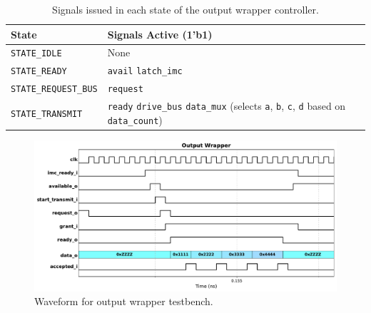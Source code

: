 \documentclass[../main.tex]{subfiles}
\begin{document}
\begin{table}[h]
    \centering
    \renewcommand{\arraystretch}{1.5}
    \setlength{\tabcolsep}{6pt}

    \begin{tabularx}{\textwidth}{@{}l X@{}}
        \toprule
        \textbf{State} & \textbf{Signals Active (1'b1)} \\
        \midrule
        \texttt{STATE\_IDLE} & 
            None \\ 
        \hline
        \texttt{STATE\_READY} & 
            \texttt{avail} \newline
            \texttt{latch\_imc} \\
        \hline
        \texttt{STATE\_REQUEST\_BUS} & 
            \texttt{request} \\
        \hline
        \texttt{STATE\_TRANSMIT} & 
            \texttt{ready} \newline
            \texttt{drive\_bus} \newline
            \texttt{data\_mux} (selects \texttt{a}, \texttt{b}, \texttt{c}, \texttt{d} based on \texttt{data\_count}) \\
        \bottomrule
    \end{tabularx}

    \caption{Signals issued in each state of the output wrapper controller.}
    \label{tab:out_wrapper_state_signals}
\end{table}

\begin{figure}[H]
    \centering
    \includegraphics[width=\linewidth]{assets/q2_out_wrapper_wave.pdf}
    \caption{Waveform for output wrapper testbench.}
    \label{fig:q2_out_wrapper_wave}
\end{figure}
\end{document}
